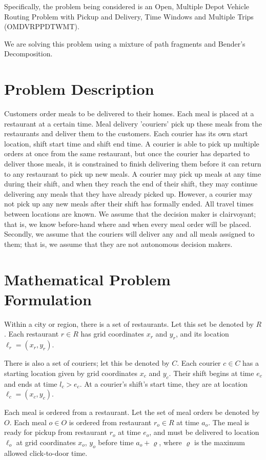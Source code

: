\documentclass{article}
\begin{document}
Specifically, the problem being considered is an Open, Multiple Depot Vehicle Routing Problem with Pickup and Delivery, Time Windows and Multiple Trips (OMDVRPPDTWMT).

We are solving this problem using a mixture of path fragments and Bender's Decomposition.

\section{Problem Description}

Customers order meals to be delivered to their homes. Each meal is placed at a restaurant at a certain time. Meal delivery 'couriers' pick up these meals from the restaurants and deliver them to the customers. Each courier has its own start location, shift start time and shift end time. A courier is able to pick up multiple orders at once from the same restaurant, but once the courier has departed to deliver those meals, it is constrained to finish delivering them before it can return to any restaurant to pick up new meals. A courier may pick up meals at any time during their shift, and when they reach the end of their shift, they may continue delivering any meals that they have already picked up. However, a courier may not pick up any new meals after their shift has formally ended. All travel times between locations are known. We assume that the decision maker is clairvoyant; that is, we know before-hand where and when every meal order will be placed. Secondly, we assume that the couriers will deliver any and all meals assigned to them; that is, we assume that they are not autonomous decision makers.

\section{Mathematical Problem Formulation}

Within a city or region, there is a set of restaurants. Let this set be denoted by $R$. Each restaurant $r\in R$ has grid coordinates $x_r$ and $y_r$, and its location $\ell_r=(x_r, y_r)$.

There is also a set of couriers; let this be denoted by $C$. Each courier $c\in C$ has a starting location given by grid coordinates $x_c$ and $y_c$. Their shift begins at time $e_c$ and ends at time $l_c>e_c$. At a courier's shift's start time, they are at location $\ell_c=(x_c, y_c)$.

Each meal is ordered from a restaurant. Let the set of meal orders be denoted by $O$. Each meal $o\in O$ is ordered from restaurant $r_o\in R$ at time $a_o$. The meal is ready for pickup from restaurant $r_o$ at time $e_o$, and must be delivered to location $\ell_o$ at grid coordinates $x_o$, $y_o$ before time $a_o+\varrho$, where $\varrho$ is the maximum allowed click-to-door time.
\end{document}
